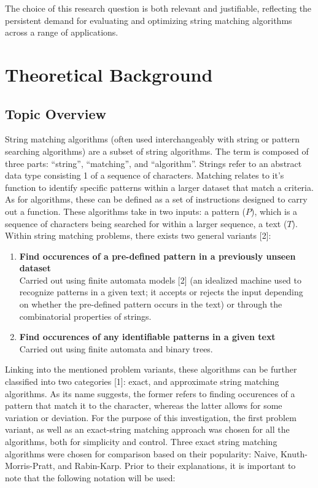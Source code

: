 \documentclass[12pt]{article}
\begin{document}
The choice of this research question is both relevant and justifiable, reflecting the persistent demand for evaluating and optimizing string matching algorithms across a range of applications.

\section{Theoretical Background} %
\subsection{Topic Overview}
String matching algorithms (often used interchangeably with string or pattern searching
algorithms) are a subset of string algorithms. The term is composed of three parts:
“string”, “matching”, and “algorithm”. Strings refer to an abstract data type consisting
1
of a sequence of characters. Matching relates to it's function to identify specific patterns
within a larger dataset that match a criteria. As for algorithms, these can be defined as a set of instructions designed to carry out a function. These algorithms take in two
inputs: a pattern ($P$), which is a sequence of characters being searched for within a larger
sequence, a text ($T$). Within string matching problems, there exists two general variants
[2]:

\begin{enumerate}
	\item \textbf{Find occurences of a pre-defined pattern in a previously unseen dataset} \\
	Carried out using finite automata models [2] (an idealized machine used to recognize
	patterns in a given text; it accepts or rejects the input depending on whether the
	pre-defined pattern occurs in the text) or through the combinatorial properties of
	strings.
	\item \textbf{Find occurences of any identifiable patterns in a given text} \\
	Carried out using finite automata and binary trees.
\end{enumerate}

Linking into the mentioned problem variants, these algorithms can be further classified into two categories [1]: exact, and approximate string matching algorithms. As
its name suggests, the former refers to finding occurences of a pattern that match it to
the character, whereas the latter allows for some variation or deviation. For the purpose
of this investigation, the first problem variant, as well as an exact-string matching approach was chosen for all the algorithms, both for simplicity and control. Three exact
string matching algorithms were chosen for comparison based on their popularity: Naive,
Knuth-Morris-Pratt, and Rabin-Karp. Prior to their explanations, it is important to note
that the following notation will be used:
\end{document}
